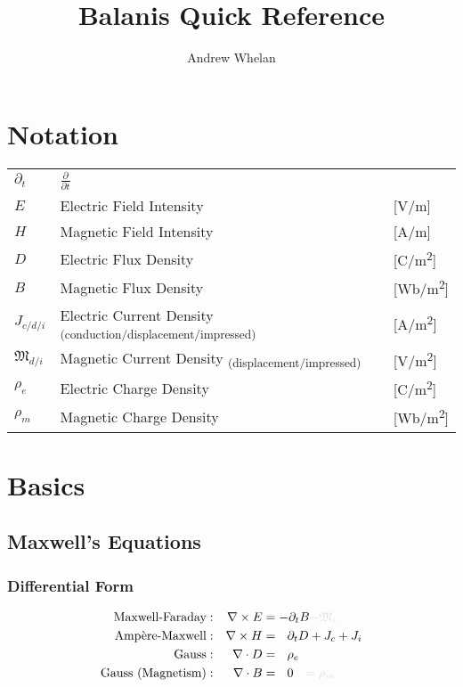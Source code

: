 \documentclass{article}
\title{Balanis Quick Reference}
\author{Andrew Whelan}
\date{}
\begin{document}
\maketitle

\tableofcontents

\newpage

\section*{Notation}
\small
\begin{tabular}{ m{4em} m{24em} m{4em} }
    \( \partial_t \) & \( \displaystyle \frac{\partial}{\partial t}\) & \\
    \( E \) & Electric Field Intensity & [V/m] \\
    \( H \) & Magnetic Field Intensity & [A/m] \\
    \( D \) & Electric Flux Density & [C/m\textsuperscript{2}] \\
    \( B \) & Magnetic Flux Density & [Wb/m\textsuperscript{2}] \\
    \( \displaystyle J_{c/d/i} \) & Electric Current Density \textsubscript{(conduction/displacement/impressed)} & [A/m\textsuperscript{2}] \\
    \( \displaystyle \mathfrak{M}_{d/i} \) & Magnetic Current Density \textsubscript{(displacement/impressed)} & [V/m\textsuperscript{2}] \\
    \( \displaystyle \rho_{e} \) & Electric Charge Density & [C/m\textsuperscript{2}] \\
    \( \displaystyle \rho_{m} \) & Magnetic Charge Density & [Wb/m\textsuperscript{2}] \\
\end{tabular}
\normalsize
\newpage
\section{Basics}
\subsection{Maxwell's Equations}
\subsubsection*{Differential Form}
    \begin{subequations}\label{eq:Maxwell}
        \begin{align}
            \text{Maxwell-Faraday} & : & \nabla \times E &= - \partial_t B \begingroup \textcolor{vanish}{- \mathfrak{M}_i } \endgroup \label{eq:MaxwellFaraday} \\
            \text{Amp\`ere-Maxwell} & : & \nabla \times H &= \ \ \partial_t D + J_{c} + J_{i} \label{eq:AmpereMaxwell} \\
            \text{Gauss} & : & \nabla \cdot D &= \ \ \rho_e \label{eq:GaussElectric} \\
            \text{Gauss (Magnetism)} & : & \nabla \cdot B &= \ \ 0 \begingroup \textcolor{vanish}{\quad = \rho_m} \endgroup \label{eq:GaussMagnetic}
        \end{align}
    \end{subequations}
\end{document}
